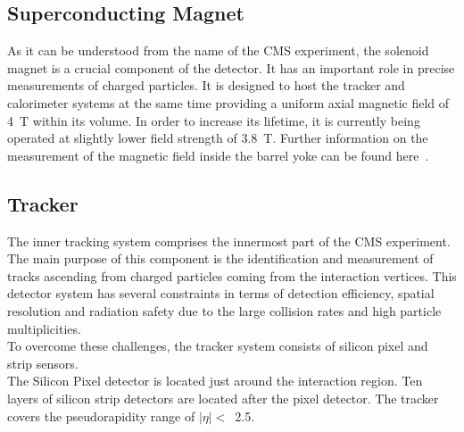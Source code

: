 \subsection{Superconducting Magnet}
As it can be understood from the name of the CMS experiment, the solenoid magnet is a crucial component of the detector. It has an important role in precise measurements of charged particles. It is designed to host the tracker and calorimeter systems at the same time providing a uniform axial magnetic field of 4~T within its volume. In order to increase its lifetime, it is currently being operated at slightly lower field strength of 3.8~T. Further information on the measurement of the magnetic field inside the  barrel yoke can be found here~\cite{CMS_Mag}.
\subsection{Tracker}
The inner tracking system comprises the innermost part of the CMS experiment. The main purpose of this component is the identification and measurement of tracks ascending from charged particles coming from the interaction vertices. This detector system has several constraints in terms of detection efficiency, spatial resolution and radiation safety due to the large collision rates and high particle multiplicities.\\
To overcome these challenges, the tracker system consists of silicon pixel and strip sensors.\\
The Silicon Pixel detector is located just around the interaction region. Ten layers of silicon strip detectors are located after the pixel detector. The tracker covers the pseudorapidity range of $|\eta|<$~2.5.
